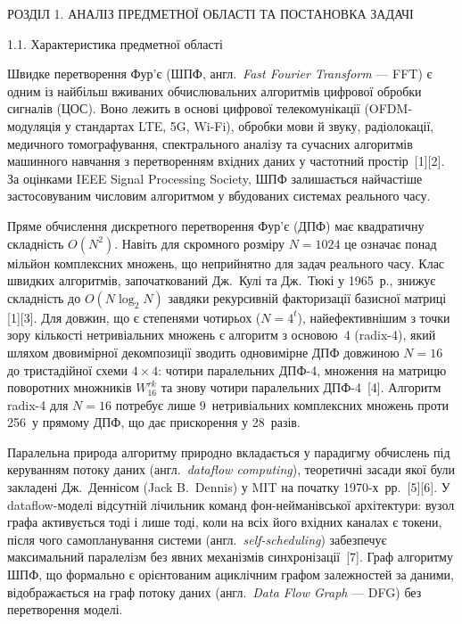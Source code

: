 
\protect{}\label{_Toc229682904}{}РОЗДІЛ 1. АНАЛІЗ ПРЕДМЕТНОЇ
ОБЛАСТІ ТА ПОСТАНОВКА ЗАДАЧІ

\protect{}\label{_Toc229682905}{}1.1. Характеристика предметної
області

Швидке перетворення Фур'є (ШПФ, англ.~\emph{Fast Fourier Transform} ---
FFT) є одним із найбільш вживаних обчислювальних алгоритмів цифрової
обробки сигналів (ЦОС). Воно лежить в основі цифрової телекомунікації
(OFDM-модуляція у стандартах LTE, 5G, Wi-Fi), обробки мови й звуку,
радіолокації, медичного томографування, спектрального аналізу та
сучасних алгоритмів машинного навчання з перетворенням вхідних даних у
частотний простір~{[}1{]}{[}2{]}. За оцінками IEEE Signal Processing
Society, ШПФ залишається найчастіше застосовуваним числовим алгоритмом у
вбудованих системах реального часу.

Пряме обчислення дискретного перетворення Фур'є (ДПФ) має квадратичну
складність \(O(N^{2})\). Навіть для скромного розміру \(N = 1024\) це
означає понад мільйон комплексних множень, що неприйнятно для задач
реального часу. Клас швидких алгоритмів, започаткований Дж.~Кулі та
Дж.~Тюкі у 1965~р., знижує складність до \(O(N\log_{2}N)\) завдяки
рекурсивній факторизації базисної матриці {[}1{]}{[}3{]}. Для довжин, що
є степенями чотирьох (\(N = 4^{t}\)), найефективнішим з точки зору
кількості нетривіальних множень є алгоритм з основою~4 (radix-4), який
шляхом двовимірної декомпозиції зводить одновимірне ДПФ довжиною
\(N = 16\) до тристадійної схеми \(4 \times 4\): чотири паралельних
ДПФ-4, множення на матрицю поворотних множників \(W_{16}^{rk}\) та знову
чотири паралельних ДПФ-4~{[}4{]}. Алгоритм radix-4 для \(N = 16\)
потребує лише 9~нетривіальних комплексних множень проти 256~у прямому
ДПФ, що дає прискорення у 28~разів.

Паралельна природа алгоритму природно вкладається у парадигму обчислень
під керуванням потоку даних (англ.~\emph{dataflow computing}),
теоретичні засади якої були закладені Дж.~Деннісом (Jack B.~Dennis) у
MIT на початку 1970-х~рр.~{[}5{]}{[}6{]}. У dataflow-моделі відсутній
лічильник команд фон-нейманівської архітектури: вузол графа активується
тоді і лише тоді, коли на всіх його вхідних каналах є токени, після чого
самопланування системи (англ.~\emph{self-scheduling}) забезпечує
максимальний паралелізм без явних механізмів синхронізації~{[}7{]}.
Граф алгоритму ШПФ, що формально є орієнтованим ациклічним графом
залежностей за даними, відображається на граф потоку даних
(англ.~\emph{Data Flow Graph} --- DFG) без перетворення моделі.

